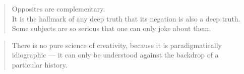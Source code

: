\begin{quotation}
  Opposites are complementary.\\
  It is the hallmark of any deep truth that its negation is also a deep truth.\\
  Some subjects are so serious that one can only joke about them.
\end{quotation}

\begin{quotation}
  There is no pure science of creativity, because it is paradigmatically idiographic --- it can only be understood against the backdrop of a particular history.
\end{quotation}


\clearpage